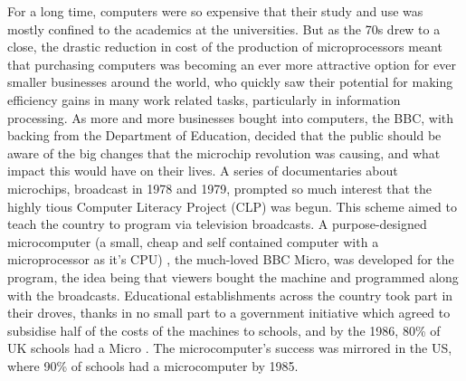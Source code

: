 \documentclass[ %
                    author={Jonathan Rankin},
                supervisor={Dr. David May, Dr. Ian Holyer},
                    degree={MEng},
                     title={CodeTouch},
                  subtitle={A Revolutionary Way To Program Real Code On Touch Screen Devices},
                      type={enterprise},
                      year={2015 } ]{dissertation}
\begin{document}
For a long time, computers were so expensive that their study and use was mostly confined to the academics at the universities. But as the 70s drew to a close, the drastic reduction in cost of the production of microprocessors meant that purchasing computers was becoming an ever more attractive option for ever smaller businesses around the world, who quickly saw their potential for making efficiency gains in many work related tasks, particularly in information processing. As more and more businesses bought into computers, the BBC, with backing from the Department of Education, decided that the public should be aware of the big changes that the microchip revolution was causing, and what impact this would have on their lives. A series of documentaries about microchips, broadcast in 1978 and 1979, prompted so much interest that the highly tious Computer Literacy Project (CLP) was begun. This scheme aimed to teach the country to program via television broadcasts. A purpose-designed microcomputer (a small, cheap and self contained computer with a microprocessor as it's CPU) , the much-loved BBC Micro, was developed for the program, the idea being that viewers bought the machine and programmed along with the broadcasts. Educational establishments across the country took part in their droves, thanks in no small part to a government initiative which agreed to subsidise half of the costs of the machines to schools, and by the 1986, 80\% of UK schools had a Micro \cite{IIfASA}. The microcomputer's success was mirrored in the US, where 90\% of schools had a microcomputer by 1985\cite{IIfASA}.
\end{document}
